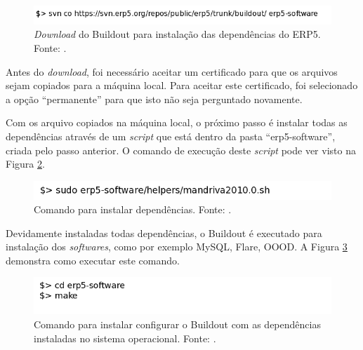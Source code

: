 \begin{figure}[!ht]
\centering
\begin{center}
\includegraphics[scale=0.660,bb=0 30 600 20]{erp5_software.png}
\end{center}
\caption{\textit{Download} do Buildout para instalação das dependências do ERP5. Fonte: \cite{erp5_buildout}.}
\label{fig:erp5_software}
\end{figure}

Antes do \textit{download}, foi necessário aceitar um certificado para que os arquivos sejam copiados para a máquina local. Para aceitar este certificado, foi selecionado a opção ``permanente'' para que isto não seja perguntado novamente.

Com os arquivo copiados na máquina local, o próximo passo é instalar todas as dependências através de um \textit{script} que está dentro da pasta ``erp5-software'', criada pelo passo anterior. O comando de execução deste \textit{script} pode ver visto na Figura \ref{fig:dependencies}.

\begin{figure}[!ht]
\centering
\begin{center}
\includegraphics[scale=0.600,bb=0 30 500 20]{erp5_dependencies.png}
\end{center}
\caption{Comando para instalar dependências. Fonte: \cite{erp5_buildout}.}
\label{fig:dependencies}
\end{figure}

Devidamente instaladas todas dependências, o Buildout é executado para instalação dos \textit{softwares}, como por exemplo MySQL, Flare, OOOD. A Figura \ref{fig:make_software} demonstra como executar este comando.

\begin{figure}[!ht]
\centering
\begin{center}
\includegraphics[scale=0.660,bb=0 40 400 65]{make_software.png}
\end{center}
\caption{Comando para instalar configurar o Buildout com as dependências instaladas no sistema operacional. Fonte: \cite{erp5_buildout}.}
\label{fig:make_software}
\end{figure}

